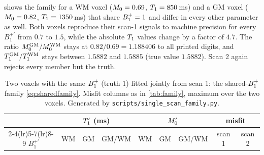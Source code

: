  shows the family for a WM voxel ($M_0=0.69$, $T_1=850$\,ms) and a GM voxel
($M_0=0.82$, $T_1=1350$\,ms) that share $B_1^{+}=1$ and differ in every other parameter as well. Both
voxels reproduce their scan-1 signals to machine precision for every $B_1^{+\prime}$ from $0.7$ to $1.5$, while
the absolute $T_1$ values change by a factor of $4.7$. The ratio $M_0^{\rm GM}/M_0^{\rm WM}$ stays at
$0.82/0.69=1.188406$ to all printed digits, and $T_1^{\rm GM}/T_1^{\rm WM}$ stays between $1.5882$ and
$1.5885$ (true value $1.5882$). Scan 2 again rejects every member but the truth.

\begin{table}[!htbp]
\centering
\caption{Two voxels with the same $B_1^{+}$ (truth $1$) fitted jointly from scan 1: the shared-$B_1^{+}$
family \eqref{eq:sharedfamily}. Misfit columns as in \cref{tab:family}, maximum over the two
voxels. Generated by \texttt{scripts/single\_scan\_family.py}.}
\label{tab:sharedfamily}
\small\setlength{\tabcolsep}{4.5pt}
\begin{tabular}{ccccccccc}
\toprule
& \multicolumn{3}{c}{$T_1'$ (ms)} & \multicolumn{3}{c}{$M_0'$} & \multicolumn{2}{c}{misfit}\\
\cmidrule(lr){2-4}\cmidrule(lr){5-7}\cmidrule(lr){8-9}
$B_1^{+\prime}$ & WM & GM & GM/WM & WM & GM & GM/WM & scan 1 & scan 2\\
\midrule

\bottomrule
\end{tabular}
\end{table}

